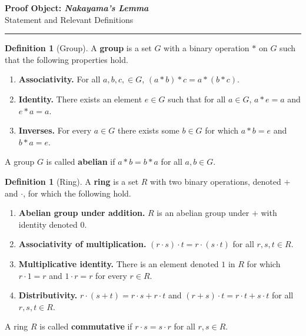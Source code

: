 \documentclass[12pt]{amsart}
\newcommand{\HRule}{\begin{center}\rule{\linewidth}{.01cm}\end{center}}
\theoremstyle{definition}
\newtheorem{definition}[theorem]{Definition}
\newtheorem{examples}[theorem]{Examples}
\theoremstyle{remark}
\begin{document}
\begin{center}
	{\large \textbf{Proof Object:  \emph{Nakayama's Lemma}} } \\ \vspace{.2cm} Statement and Relevant Definitions
\end{center}

\vspace{-.5cm}

\HRule


\begin{definition}[Group]
A \textbf{group} is a set $G$ with a binary operation $\ast$ on $G$ such that the following properties hold.
\begin{enumerate}[topsep=0cm,itemsep=0cm]
\item \textbf{Associativity.}  For all $a, b, c, \in G$, $(a \ast b) \ast c = a \ast (b \ast c)$.
\item \textbf{Identity.}  There exists an element $e \in G$ such that for all $a \in G$, $a \ast e = a$ and $e \ast a = a$.
\item \textbf{Inverses.}  For every $a \in G$ there exists some $b \in G$ for which $a \ast b  = e$ and $b \ast a = e$. 
\end{enumerate}
A group $G$ is called \textbf{abelian} if $a \ast b = b \ast a$ for all $a, b \in G$.
\end{definition}


\begin{definition}[Ring]
A \textbf{ring} is a set $R$ with two binary operations, denoted $+$ and $\cdot$, for which the following hold.
\begin{enumerate}[topsep=0cm,itemsep=0cm]
\item \textbf{Abelian group under addition.}  $R$ is an abelian group under $+$ with identity denoted $0$.
\item \textbf{Associativity of multiplication.}  $(r \cdot s) \cdot t = r \cdot (s \cdot t)$ for all $r, s, t \in R$.
 \item \textbf{Multiplicative identity.}  There is an element  denoted $1$ in $R$ for which $r \cdot 1 = r$ and $1 \cdot r = r$ for every $r \in R$. 
 \item \textbf{Distributivity.} $r \cdot (s + t) = r \cdot s + r \cdot t$ and  $(r + s) \cdot t = r \cdot t + s \cdot t$ for all $r, s, t \in R$.  
\end{enumerate}
A ring $R$ is called \textbf{commutative} if $r \cdot s = s \cdot r$ for all $r, s \in R$. 
\end{definition}
\end{document}
